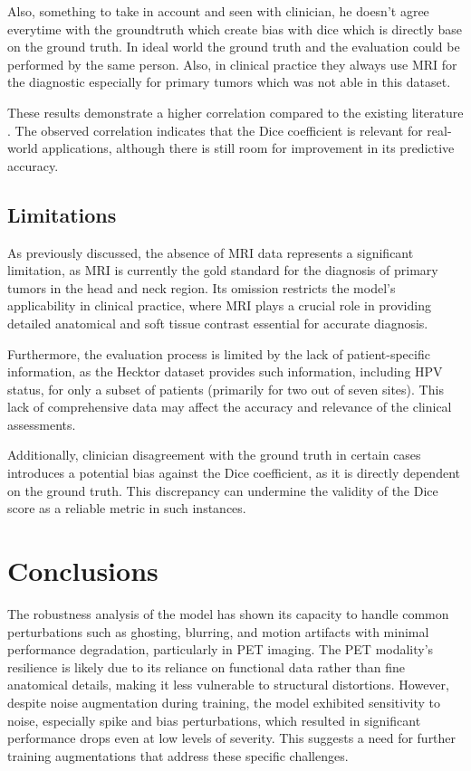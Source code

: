 Also, something to take in account and seen with clinician, he doesn't agree everytime with the groundtruth which create bias with dice which is directly base on the ground truth. In ideal
world the ground truth and the evaluation could be performed by the same person. Also, in clinical practice they always use MRI for the diagnostic especially for primary tumors which was not able in this dataset.

These results demonstrate a higher correlation compared to the existing literature \cite{Kofler2023}. The observed correlation indicates that the Dice coefficient is relevant for real-world applications, although there is still room for improvement in its predictive accuracy.

\subsection{Limitations}
As previously discussed, the absence of MRI data represents a significant limitation, as MRI is currently the gold standard for the diagnosis of primary tumors in the head and neck region. Its omission restricts the model's applicability in clinical practice, where MRI plays a crucial role in providing detailed anatomical and soft tissue contrast essential for accurate diagnosis.

Furthermore, the evaluation process is limited by the lack of patient-specific information, as the Hecktor dataset provides such information, including HPV status, for only a subset of patients (primarily for two out of seven sites). This lack of comprehensive data may affect the accuracy and relevance of the clinical assessments.

Additionally, clinician disagreement with the ground truth in certain cases introduces a potential bias against the Dice coefficient, as it is directly dependent on the ground truth. This discrepancy can undermine the validity of the Dice score as a reliable metric in such instances.

\newpage
\section{Conclusions}

The robustness analysis of the model has shown its capacity to handle common perturbations such as ghosting, blurring, and motion artifacts with minimal performance degradation, particularly in PET imaging. The PET modality’s resilience is likely due to its reliance on functional data rather than fine anatomical details, making it less vulnerable to structural distortions. However, despite noise augmentation during training, the model exhibited sensitivity to noise, especially spike and bias perturbations, which resulted in significant performance drops even at low levels of severity. This suggests a need for further training augmentations that address these specific challenges.

